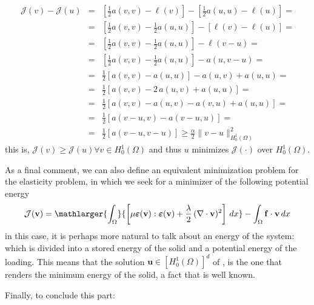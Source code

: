 \begin{eqnarray}
\mathcal{J}(v) - \mathcal{J}(u) & = & \left [\frac12 a(v,v) - \ell(v)\right] - \left [\frac12 a(u,u) - \ell(u)\right] = \nonumber \\
& = & \left[\frac12 a(v,v) - \frac12 a(u,u)\right] - [\ell(v) - \ell(u)] = \nonumber \\
& = & \left[\frac12 a(v,v) - \frac12 a(u,u)\right] - \ell(v - u) = \nonumber \\
& = & \left[\frac12 a(v,v) - \frac12 a(u,u)\right] - a(u,v-u) = \nonumber \\
& = & \frac12 \left [a(v,v) - a(u,u)  \right ] - a(u,v) + a(u,u) = \nonumber \\
& = & \frac12 \left  [ a(v,v) - 2\,a(u,v) + a(u,u)  \right ] = \nonumber \\
& = & \frac12 \left  [ a(v,v) - a(u,v) - a(v,u) + a(u,u)  \right ] = \nonumber \\
& = & \frac12 \left  [ a(v-u,v) - a(v-u,u)  \right ] = \nonumber\\
& = & \frac12 \left  [ a(v-u,v-u) \right ] \ge \frac{\alpha}{2} \lVert v-u\rVert^2_{H^1_0(\Omega)} \nonumber
\end{eqnarray}
this is, $\mathcal{J}(v) \ge \mathcal{J}(u) \forall v \in H^1_0(\Omega)$
and thus $u$ minimizes $\mathcal{J}(\cdot)$ over $H^1_0(\Omega)$.

As a final comment, we can also define an equivalent minimization problem for
the elasticity problem, in which we seek for a minimizer of the following
potential energy
\begin{equation}
\mathcal{J}(\mathbf{v}) = \mathlarger{\int_{\Omega}}{\left [\mu \boldsymbol{\varepsilon}(\mathbf{v}) : \boldsymbol{\varepsilon}(\mathbf{v})+ 
\frac{\lambda}{2}\,(\nabla \cdot \mathbf{v})^2\right ]\,dx} -
\int_{\Omega}{\mathbf{f}\cdot \mathbf{v}}\,dx
\end{equation}
in this case, it is perhaps more natural to talk about an energy of the system:
which is divided into a stored energy of the solid and a potential energy of
the loading. This means that the solution $\mathbf{u} \in \left [H_0^1(\Omega)\right]^d$
of , is the one that renders the minimum energy of the
solid, a fact that is well known.

Finally, to conclude this part:

